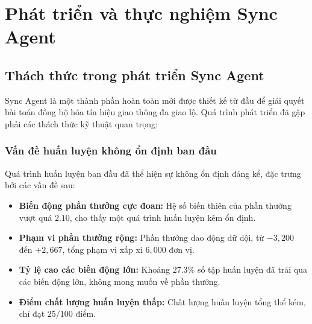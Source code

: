 \section{Phát triển và thực nghiệm Sync Agent}

\subsection{Thách thức trong phát triển Sync Agent}

Sync Agent là một thành phần hoàn toàn mới được thiết kế từ đầu để giải quyết
bài toán đồng bộ hóa tín hiệu giao thông đa giao lộ. Quá trình phát triển đã gặp
phải các thách thức kỹ thuật quan trọng:

\subsubsection{Vấn đề huấn luyện không ổn định ban đầu}

Quá trình huấn luyện ban đầu đã thể hiện sự không ổn định đáng kể, đặc trưng bởi các vấn đề sau:

\begin{itemize}
    \item \textbf{Biến động phần thưởng cực đoan:} Hệ số biến thiên của phần thưởng vượt quá $2.10$, cho thấy một quá trình huấn luyện kém ổn định.
    \item \textbf{Phạm vi phần thưởng rộng:} Phần thưởng dao động dữ dội, từ $-3,200$ đến $+2,667$, tổng phạm vi xấp xỉ $6,000$ đơn vị.
    \item \textbf{Tỷ lệ cao các biến động lớn:} Khoảng $27.3\%$ số tập huấn luyện đã trải qua các biến động lớn, không mong muốn về phần thưởng.
    \item \textbf{Điểm chất lượng huấn luyện thấp:} Chất lượng huấn luyện tổng thể kém, chỉ đạt $25/100$ điểm.
\end{itemize}


